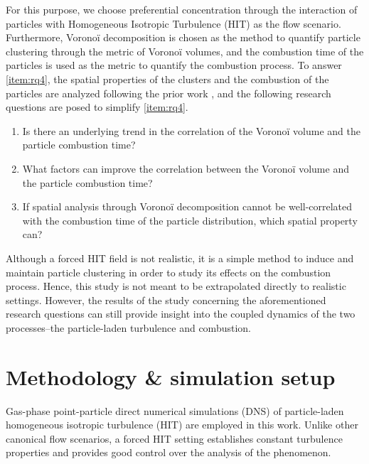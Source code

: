 \documentclass[times,twocolumn,final]{elsarticle}
\newcommand{\mrm}[1]{\mathrm{#1}}
\newcommand{\St}{\mathrm{St}}
\newcommand{\green}{\color{ForestGreen}}
\newcommand{\green}{}
\begin{document}
For this purpose, we choose preferential concentration through the interaction of particles with Homogeneous Isotropic Turbulence (HIT) as the flow scenario. Furthermore, Vorono\"i decomposition is chosen as the method to quantify particle clustering through the metric of Vorono\"i volumes, and the combustion time of the particles is used as the metric to quantify the combustion process. {\green To answer \ref{item:rq4}, the spatial properties of the clusters and the combustion of the particles are analyzed following the prior work \cite{Hemamalini2024,Thaeter2024}, and the following research questions are posed to simplify \ref{item:rq4}.}
\begin{enumerate}[label=RQ:\Roman*,leftmargin=1.15cm,start=4]
\green
\itemsep0em
    \item Is there an underlying trend in the correlation of the Vorono\"i volume and the particle combustion time? \label{item:rqa}
    \item What factors can improve the correlation between the Vorono\"i volume and the particle combustion time? \label{item:rqb}
    \item If spatial analysis through Vorono\"i decomposition cannot be well-correlated with the combustion time of the particle distribution, which spatial property can?\label{item:rqc}
\end{enumerate}

Although a forced HIT field is not realistic, it is a simple method to induce and maintain particle clustering in order to study its effects on the combustion process. Hence, this study is not meant to be extrapolated directly to realistic settings. However, the results of the study concerning the aforementioned research questions can still provide insight into the coupled dynamics of the two processes--the particle-laden turbulence and combustion.



\section{Methodology \& simulation setup\label{sec:methodology}}

Gas-phase point-particle direct numerical simulations (DNS) of particle-laden homogeneous isotropic turbulence (HIT) are employed in this work. Unlike other canonical flow scenarios, a forced HIT setting establishes constant turbulence properties and provides good control over the analysis of the phenomenon.
\end{document}
